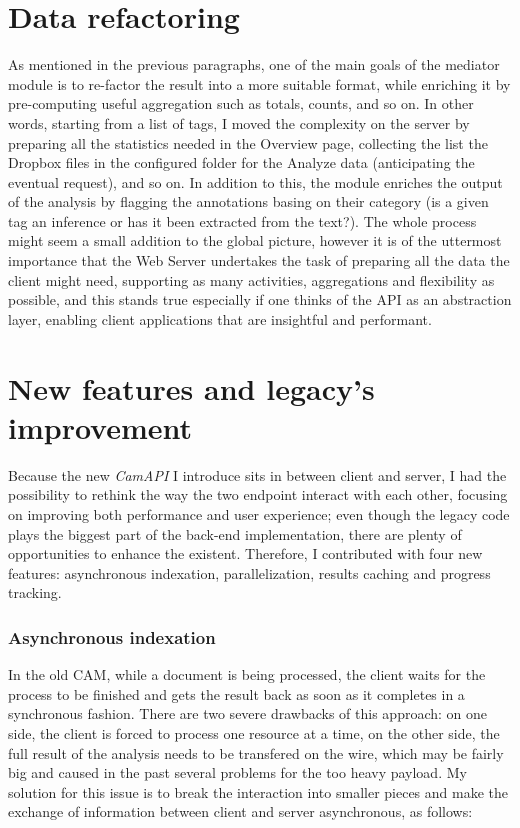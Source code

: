 \documentclass[12pt,oneside,svgnames]{memoir}
\begin{document}
\section{Data refactoring}\label{data-refactoring}

As mentioned in the previous paragraphs, one of the main goals of the
mediator module is to re-factor the result into a more suitable format,
while enriching it by pre-computing useful aggregation such as totals,
counts, and so on. In other words, starting from a list of tags, I moved
the complexity on the server by preparing all the statistics needed in
the Overview page, collecting the list the Dropbox files in the
configured folder for the Analyze data (anticipating the eventual
request), and so on. In addition to this, the module enriches the output
of the analysis by flagging the annotations basing on their category (is
a given tag an inference or has it been extracted from the text?). The
whole process might seem a small addition to the global picture, however
it is of the uttermost importance that the Web Server undertakes the
task of preparing all the data the client might need, supporting as many
activities, aggregations and flexibility as possible, and this stands
true especially if one thinks of the API as an abstraction layer,
enabling client applications that are insightful and performant.

\section{New features and legacy's
improvement}\label{new-features-and-legacys-improvement}

Because the new \emph{CamAPI} I introduce sits in between client and
server, I had the possibility to rethink the way the two endpoint
interact with each other, focusing on improving both performance and
user experience; even though the legacy code plays the biggest part of
the back-end implementation, there are plenty of opportunities to
enhance the existent. Therefore, I contributed with four new features:
asynchronous indexation, parallelization, results caching and progress
tracking.

\subsubsection*{Asynchronous indexation}\label{asynchronous-indexation}

In the old CAM, while a document is being processed, the client waits
for the process to be finished and gets the result back as soon as it
completes in a synchronous fashion. There are two severe drawbacks of
this approach: on one side, the client is forced to process one resource
at a time, on the other side, the full result of the analysis needs to
be transfered on the wire, which may be fairly big and caused in the
past several problems for the too heavy payload. My solution for this
issue is to break the interaction into smaller pieces and make the
exchange of information between client and server asynchronous, as
follows:
\end{document}
